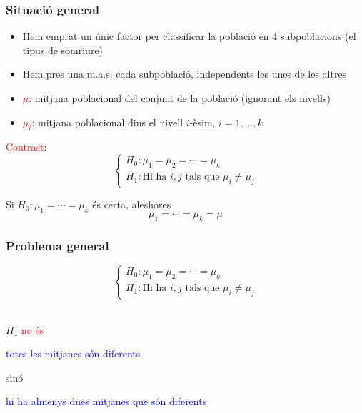 \documentclass[12pt,t]{beamer}
\newcommand{\red}[1]{\textcolor{red}{#1}}
\newcommand{\blue}[1]{\textcolor{blue}{#1}}
\theoremstyle{plain}
\theoremstyle{definition}
\begin{document}
\begin{frame}
\frametitle{Situació general}

\begin{itemize}
\item Hem emprat un únic factor per classificar la població en 4 subpoblacions (el tipus de somriure)\medskip




\item Hem pres una m.a.s.  cada subpoblació,  independents les unes de les altres
\end{itemize}\pause\medskip


\begin{itemize}
\item \red{$\mu$}: mitjana poblacional  del conjunt de la població  (ignorant els nivells)
\medskip

\item \red{$\mu_i$}: mitjana poblacional dins el nivell $i$-èsim,
$i=1,\ldots,k$
\medskip
\end{itemize}\medskip

\red{Contrast}:
$$
\left\{
\begin{array}{l}
H_0 : \mu_1=\mu_{2}=\cdots=\mu_{k} \\
H_1 : \mbox{Hi ha  }i,j\mbox{ tals que }  \mu_i \not=\mu_j
\end{array}
\right.
$$\pause\medskip

Si $H_0: \mu_1=\cdots=\mu_k$ és certa, aleshores
$$
\mu_1=\cdots=\mu_k=\mu
$$

\end{frame}




\begin{frame}
\frametitle{Problema general}

$$
\left\{
\begin{array}{l}
H_0 : \mu_1 =\mu_2 =\cdots =\mu_k \\
H_1 : \mbox{Hi ha  }i,j\mbox{ tals que }  \mu_i \not=\mu_j
\end{array}
\right.
$$\

$H_1$ \red{no és}
\begin{center}
\blue{totes les mitjanes són diferents}
\end{center}
sinó
\begin{center}
\blue{hi ha almenys dues mitjanes que són diferents}
\end{center}
\end{frame}
\end{document}
